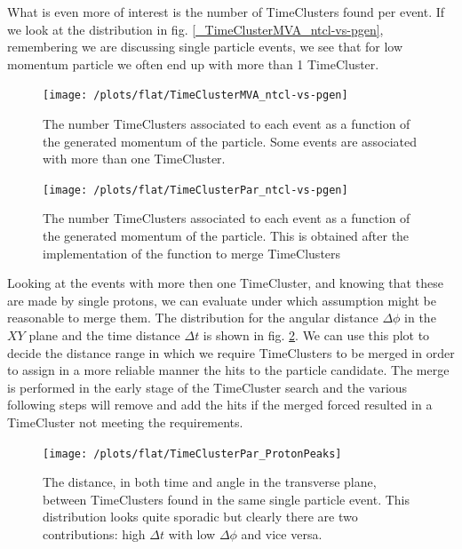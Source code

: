 \documentclass[12pt,a4paper,openright, oneside, titlepage]{book} %
\begin{document}
\noindent What is even more of interest is the number of TimeClusters found per event. If we look at the distribution in fig. \ref{_TimeClusterMVA_ntcl-vs-pgen}, remembering we are discussing single particle events, we see that for low momentum particle we often end up with more than 1 TimeCluster.\\

\begin{figure}[!htb]
    \centering
    \begin{minipage}{.49\textwidth}
		\centering
		\texttt{[image: /plots/flat/TimeClusterMVA\_ntcl-vs-pgen]}
		\caption{The number TimeClusters associated to each event as a function of the generated momentum of the particle. Some events are associated with more than one TimeCluster.}
		\label{_TimeClusterMVA_ntcl-vs-pgen}
	\end{minipage}
	\hfill
    \begin{minipage}{0.49\textwidth}
    	\centering
    	\texttt{[image: /plots/flat/TimeClusterPar\_ntcl-vs-pgen]}
		\caption{The number TimeClusters associated to each event as a function of the generated momentum of the particle. This is obtained after the implementation of the function to merge TimeClusters}
		\label{_TimeClusterPar_ntcl-vs-pgen}
	\end{minipage}
\end{figure}

\noindent Looking at the events with more then one TimeCluster, and knowing that these are made by single protons, we can evaluate under which assumption might be reasonable to merge them. 
The distribution for the angular distance $\Delta \phi$ in the $XY$ plane and the time distance $\Delta t$ is shown in fig. \ref{_TimeClusterPar_ProtonPeaks}. 
We can use this plot to decide the distance range in which we require TimeClusters to be merged in order to assign in a more reliable manner the hits to the particle candidate. 
The merge is performed in the early stage of the TimeCluster search and the various following steps will remove and add the hits if the merged forced resulted in a TimeCluster not meeting the requirements.

\begin{figure}[h!]
\centering
\texttt{[image: /plots/flat/TimeClusterPar\_ProtonPeaks]}
\caption{The distance, in both time and angle in the transverse plane, between TimeClusters found in the same single particle event. This distribution looks quite sporadic but clearly there are two contributions: high $\Delta t$ with low $\Delta \phi$ and vice versa.}
\label{_TimeClusterPar_ProtonPeaks}
\end{figure}
\end{document}
